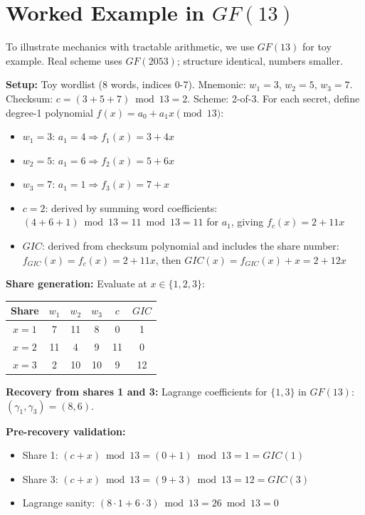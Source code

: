 \documentclass[11pt]{article}
\begin{document}
\section{\texorpdfstring{Worked Example in $GF(13)$}{Worked Example in GF(13)}}
\label{sec:example}

To illustrate mechanics with tractable arithmetic, we use $GF(13)$ for toy example. Real scheme uses $GF(2053)$; structure identical, numbers smaller.

\textbf{Setup:} Toy wordlist (8 words, indices 0-7). Mnemonic: $w_1 = 3$, $w_2 = 5$, $w_3 = 7$. Checksum: $c = (3+5+7) \bmod 13 = 2$. Scheme: 2-of-3. For each secret, define degree-1 polynomial $f(x) = a_0 + a_1 x \pmod{13}$:
\begin{itemize}[noitemsep]
    \item $w_1 = 3$: $a_1 = 4 \Rightarrow f_1(x) = 3 + 4x$
    \item $w_2 = 5$: $a_1 = 6 \Rightarrow f_2(x) = 5 + 6x$
    \item $w_3 = 7$: $a_1 = 1 \Rightarrow f_3(x) = 7 + x$
    \item $c = 2$: derived by summing word coefficients: $(4+6+1) \bmod 13 = 11 \bmod 13 = 11$ for $a_1$, giving $f_c(x) = 2 + 11x$
    \item $GIC$: derived from checksum polynomial and includes the share number: $f_{GIC}(x) = f_c(x) = 2 + 11x$, then $GIC(x) = f_{GIC}(x) + x = 2 + 12x$
\end{itemize}

\textbf{Share generation:} Evaluate at $x \in \{1, 2, 3\}$:
\begin{center}
\small
\begin{tabular}{@{}cccccc@{}}
\toprule
\textbf{Share} & $w_1$ & $w_2$ & $w_3$ & $c$ & $GIC$ \\ \midrule
$x=1$ & 7 & 11 & 8 & 0 & 1 \\
$x=2$ & 11 & 4 & 9 & 11 & 0 \\
$x=3$ & 2 & 10 & 10 & 9 & 12 \\
\bottomrule
\end{tabular}
\end{center}

\textbf{Recovery from shares 1 and 3:} Lagrange coefficients for $\{1, 3\}$ in $GF(13)$: $(\gamma_1, \gamma_3) = (8, 6)$.

\textbf{Pre-recovery validation:}
\begin{itemize}[noitemsep]
    \item Share 1: $(c + x) \bmod 13 = (0 + 1) \bmod 13 = 1 = GIC(1)$ \quad \checkmark
    \item Share 3: $(c + x) \bmod 13 = (9 + 3) \bmod 13 = 12 = GIC(3)$ \quad \checkmark
    \item Lagrange sanity: $(8 \cdot 1 + 6 \cdot 3) \bmod 13 = 26 \bmod 13 = 0$ \quad \checkmark
\end{itemize}
\end{document}
